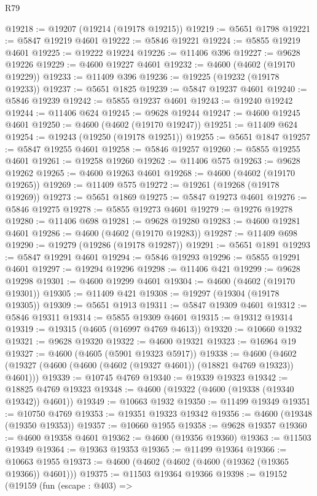 \begin{lexlean}{R79}
\begin{coremodule}
@19218 := @19207 (@19214 (@19178 @19215))
@19219 := @5651 @1798
@19221 := @5847 @19219 @4601
@19222 := @5846 @19221
@19224 := @5855 @19219 @4601
@19225 := @19222 @19224
@19226 := @11406 @396
@19227 := @9628 @19226
@19229 := @4600 @19227 @4601
@19232 := @4600 (@4602 (@19170 @19229))
@19233 := @11409 @396
@19236 := @19225 (@19232 (@19178 @19233))
@19237 := @5651 @1825
@19239 := @5847 @19237 @4601
@19240 := @5846 @19239
@19242 := @5855 @19237 @4601
@19243 := @19240 @19242
@19244 := @11406 @624
@19245 := @9628 @19244
@19247 := @4600 @19245 @4601
@19250 := @4600 (@4602 (@19170 @19247))
@19251 := @11409 @624
@19254 := @19243 (@19250 (@19178 @19251))
@19255 := @5651 @1847
@19257 := @5847 @19255 @4601
@19258 := @5846 @19257
@19260 := @5855 @19255 @4601
@19261 := @19258 @19260
@19262 := @11406 @575
@19263 := @9628 @19262
@19265 := @4600 @19263 @4601
@19268 := @4600 (@4602 (@19170 @19265))
@19269 := @11409 @575
@19272 := @19261 (@19268 (@19178 @19269))
@19273 := @5651 @1869
@19275 := @5847 @19273 @4601
@19276 := @5846 @19275
@19278 := @5855 @19273 @4601
@19279 := @19276 @19278
@19280 := @11406 @698
@19281 := @9628 @19280
@19283 := @4600 @19281 @4601
@19286 := @4600 (@4602 (@19170 @19283))
@19287 := @11409 @698
@19290 := @19279 (@19286 (@19178 @19287))
@19291 := @5651 @1891
@19293 := @5847 @19291 @4601
@19294 := @5846 @19293
@19296 := @5855 @19291 @4601
@19297 := @19294 @19296
@19298 := @11406 @421
@19299 := @9628 @19298
@19301 := @4600 @19299 @4601
@19304 := @4600 (@4602 (@19170 @19301))
@19305 := @11409 @421
@19308 := @19297 (@19304 (@19178 @19305))
@19309 := @5651 @1913
@19311 := @5847 @19309 @4601
@19312 := @5846 @19311
@19314 := @5855 @19309 @4601
@19315 := @19312 @19314
@19319 := @19315 (@4605 (@16997 @4769 @4613))
@19320 := @10660 @1932
@19321 := @9628 @19320
@19322 := @4600 @19321
@19323 := @16964 @19
@19327 := @4600 (@4605 (@5901 @19323 @5917))
@19338 := @4600 (@4602 (@19327 (@4600 (@4600 (@4602 (@19327 @4601)) (@18821 @4769 @19323)) @4601)))
@19339 := @10745 @4769
@19340 := @19339 @19323
@19342 := @18825 @4769 @19323
@19348 := @4600 (@19322 (@4600 (@19338 (@19340 @19342)) @4601))
@19349 := @10663 @1932
@19350 := @11499 @19349
@19351 := @10750 @4769
@19353 := @19351 @19323 @19342
@19356 := @4600 (@19348 (@19350 @19353))
@19357 := @10660 @1955
@19358 := @9628 @19357
@19360 := @4600 @19358 @4601
@19362 := @4600 (@19356 @19360)
@19363 := @11503 @19349
@19364 := @19363 @19353
@19365 := @11499 @19364
@19366 := @10663 @1955
@19373 := @4600 (@4602 (@4602 (@4600 (@19362 (@19365 @19366)) @4601)))
@19375 := @11503 @19364 @19366
@19398 := @19152
    (@19159
      (fun (escape : @403) =>

\end{coremodule}
\end{lexlean}
